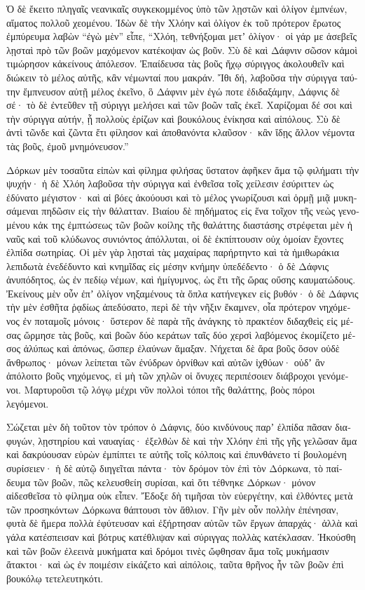 \documentclass{book}
\begin{document}
\begin{pairs}
\begin{Leftside}
\begin{greek}
  Ὁ δὲ ἔκειτο πληγαῖς νεανικαῖς συγκεκομμένος ὑπὸ τῶν λῃστῶν καὶ ὀλίγον ἐμπνέων, αἵματος πολλοῦ χεομένου. Ἰδὼν δὲ τὴν Χλόην καὶ ὀλίγον ἐκ τοῦ πρότερον ἔρωτος ἐμπύρευμα λαβὼν “ἐγὼ μὲν” εἶπε, “Χλόη, τεθνήξομαι μετʼ ὀλίγον· οἱ γάρ με ἀσεβεῖς λῃσταὶ πρὸ τῶν βοῶν μαχόμενον κατέκοψαν ὡς βοῦν.  Σὺ δὲ καὶ Δάφνιν σῶσον κἀμοὶ τιμώρησον κἀκείνους ἀπόλεσον. Ἐπαίδευσα τὰς βοῦς ἤχῳ σύριγγος ἀκολουθεῖν καὶ διώκειν τὸ μέλος αὐτῆς, κἂν νέμωνταί που μακράν. Ἴθι δή, λαβοῦσα τὴν σύριγγα ταύτην ἔμπνευσον αὐτῇ μέλος ἐκεῖνο, ὃ Δάφνιν μὲν ἐγώ ποτε ἐδιδαξάμην, Δάφνις δὲ σέ· τὸ δὲ ἐντεῦθεν τῇ σύριγγι μελήσει καὶ τῶν βοῶν ταῖς ἐκεῖ.  Χαρίζομαι δέ σοι καὶ τὴν σύριγγα αὐτήν, ᾗ πολλοὺς ἐρίζων καὶ βουκόλους ἐνίκησα καὶ αἰπόλους. Σὺ δὲ ἀντὶ τῶνδε καὶ ζῶντα ἔτι φίλησον καὶ ἀποθανόντα κλαῦσον· κἂν ἴδῃς ἄλλον νέμοντα τὰς βοῦς, ἐμοῦ μνημόνευσον.”
\pend


  Δόρκων μὲν τοσαῦτα εἰπὼν καὶ φίλημα φιλήσας ὕστατον ἀφῆκεν ἅμα τῷ φιλήματι τὴν ψυχήν· ἡ δὲ Χλόη λαβοῦσα τὴν σύριγγα καὶ ἐνθεῖσα τοῖς χείλεσιν ἐσύριττεν ὡς ἐδύνατο μέγιστον· καὶ αἱ βόες ἀκούουσι καὶ τὸ μέλος γνωρίζουσι καὶ ὁρμῇ μιᾷ μυκησάμεναι πηδῶσιν εἰς τὴν θάλατταν.  Βιαίου δὲ πηδήματος εἰς ἕνα τοῖχον τῆς νεὼς γενομένου κἀκ της ἐμπτώσεως τῶν βοῶν κοίλης τῆς θαλάττης διαστάσης στρέφεται μὲν ἡ ναῦς καὶ τοῦ κλύδωνος συνιόντος ἀπόλλυται, οἱ δὲ ἐκπίπτουσιν οὐχ ὁμοίαν ἔχοντες ἐλπίδα σωτηρίας.  Οἱ μὲν γὰρ λῃσταὶ τὰς μαχαίρας παρήρτηντο καὶ τὰ ἡμιθωράκια λεπιδωτὰ ἐνεδέδυντο καὶ κνημῖδας εἰς μέσην κνήμην ὑπεδέδεντο· ὁ δὲ Δάφνις ἀνυπόδητος, ὡς ἐν πεδίῳ νέμων, καὶ ἡμίγυμνος,  ὡς ἔτι τῆς ὥρας οὔσης καυματώδους. Ἐκείνους μὲν οὖν ἐπʼ ὀλίγον νηξαμένους τὰ ὅπλα κατήνεγκεν εἰς βυθόν· ὁ δὲ Δάφνις τὴν μὲν ἐσθῆτα ῥᾳδίως ἀπεδύσατο, περὶ δὲ τὴν νῆξιν ἔκαμνεν, οἷα πρότερον νηχόμενος ἐν ποταμοῖς μόνοις·  ὕστερον δὲ παρὰ τῆς ἀνάγκης τὸ πρακτέον διδαχθεὶς εἰς μέσας ὥρμησε τὰς βοῦς, καὶ βοῶν δύο κεράτων ταῖς δύο χερσὶ λαβόμενος ἐκομίζετο μέσος ἀλύπως καὶ ἀπόνως, ὥσπερ ἐλαύνων ἅμαξαν.  Νήχεται δὲ ἄρα βοῦς ὅσον οὐδὲ ἄνθρωπος· μόνων λείπεται τῶν ἐνύδρων ὀρνίθων καὶ αὐτῶν ἰχθύων· οὐδʼ ἂν ἀπόλοιτο βοῦς νηχόμενος, εἰ μὴ τῶν χηλῶν οἱ ὄνυχες περιπέσοιεν διάβροχοι γενόμενοι. Μαρτυροῦσι τῷ λόγῳ μέχρι νῦν πολλοὶ τόποι τῆς θαλάττης, βοὸς πόροι λεγόμενοι.
\pend


  Σώζεται μὲν δὴ τοῦτον τὸν τρόπον ὁ Δάφνις, δύο κινδύνους παρʼ ἐλπίδα πᾶσαν διαφυγών, λῃστηρίου καὶ ναυαγίας· ἐξελθὼν δὲ καὶ τὴν Χλόην ἐπὶ τῆς γῆς γελῶσαν ἅμα καὶ δακρύουσαν εὑρὼν ἐμπίπτει τε αὐτῆς τοῖς κόλποις καὶ ἐπυνθάνετο τί βουλομένη συρίσειεν·  ἡ δὲ αὐτῷ διηγεῖται πάντα· τὸν δρόμον τὸν ἐπὶ τὸν Δόρκωνα, τὸ παίδευμα τῶν βοῶν, πῶς κελευσθείη συρίσαι, καὶ ὅτι τέθνηκε Δόρκων· μόνον αἰδεσθεῖσα τὸ φίλημα οὐκ εἶπεν. Ἔδοξε δὴ τιμῆσαι τὸν εὐεργέτην, καὶ ἐλθόντες μετὰ τῶν προσηκόντων Δόρκωνα θάπτουσι τὸν ἄθλιον.  Γῆν μὲν οὖν πολλὴν ἐπένησαν, φυτὰ δὲ ἥμερα πολλὰ ἐφύτευσαν καὶ ἐξήρτησαν αὐτῶν τῶν ἔργων ἀπαρχάς· ἀλλὰ καὶ γάλα κατέσπεισαν καὶ βότρυς κατέθλιψαν καὶ σύριγγας πολλὰς κατέκλασαν.  Ἠκούσθη καὶ τῶν βοῶν ἐλεεινὰ μυκήματα καὶ δρόμοι τινὲς ὤφθησαν ἅμα τοῖς μυκήμασιν ἄτακτοι· καὶ ὡς ἐν ποιμέσιν εἰκάζετο καὶ αἰπόλοις, ταῦτα θρῆνος ἦν τῶν βοῶν ἐπὶ βουκόλῳ τετελευτηκότι.
\pend



\end{greek}
\end{Leftside}
\end{pairs}
\end{document}
